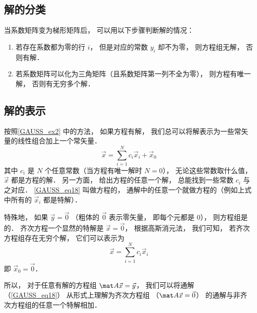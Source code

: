 \subsection{解的分类}

当系数矩阵变为梯形矩阵后， 可以用以下步骤判断解的情况：%
\begin{enumerate}
\item 若存在系数都为零的行 $i$， 但是对应的常数 $y_i$ 却不为零， 则方程组无解， 否则有解．
\item 若系数矩阵可以化为三角矩阵（且系数矩阵第一列不全为零）， 则方程有唯一解， 否则有无穷多个解．
\end{enumerate}

\subsection{解的表示}
按照\autoref{GAUSS_ex2} 中的方法， 如果方程有解， 我们总可以将解表示为一些常矢量的线性组合加上一个常矢量．
\begin{equation}\label{GAUSS_eq18}
\vec x = \sum_{i=1}^{N} c_i \vec x_i + \vec x_0
\end{equation}
其中 $c_i$ 是 $N$ 个任意常数（当方程有唯一解时 $N = 0$）， 无论这些常数取什么值， $\vec x$ 都是方程的解． 另一方面， 给出方程的任意一个解， 总能找到一些常数 $c_i$ 与之对应． \autoref{GAUSS_eq18} 叫做方程的， 通解中的任意一个就做方程的（例如上式中所有的 $\vec x_i$ 都是特解）．

特殊地， 如果 $\vec y = \vec 0$ （粗体的 $\vec 0$ 表示零矢量， 即每个元都是 0），%
则方程组是的． 齐次方程一个显然的特解是 $\vec x = \vec 0$， 根据高斯消元法， 我们可知， 若齐次方程组存在无穷个解， 它们可以表示为
\begin{equation}\label{GAUSS_eq19}
\vec x = \sum_{i=1}^{N} c_i \vec x_i
\end{equation}
即 $\vec x_0 = \vec 0$．

所以， 对于任意有解的方程组 $\mat A \vec x = \vec y$， 我们可以将通解（\autoref{GAUSS_eq18}） 从形式上理解为齐次方程组 （$\mat A \vec x = \vec 0$） 的通解与非齐次方程组的任意一个特解相加．
